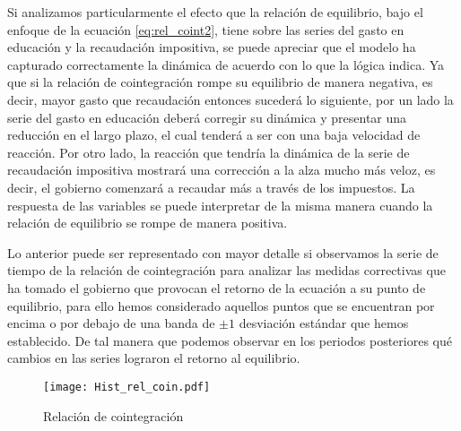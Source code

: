 Si analizamos particularmente el efecto que la relación de equilibrio, bajo el enfoque de la ecuación \ref{eq:rel_coint2}, tiene sobre las series del gasto en educación y la recaudación impositiva, se puede apreciar que el modelo ha capturado correctamente la dinámica de acuerdo con lo que la lógica indica. Ya que si la relación de cointegración rompe su equilibrio de manera negativa, es decir, mayor gasto que recaudación entonces sucederá lo siguiente, por un lado la serie del gasto en educación deberá corregir su dinámica y presentar una reducción en el largo plazo, el cual tenderá a ser con una baja velocidad de reacción. Por otro lado, la reacción que tendría la dinámica de la serie de recaudación impositiva mostrará una corrección a la alza mucho más veloz, es decir, el gobierno comenzará a recaudar más a través de los impuestos. La respuesta de las variables se puede interpretar de la misma manera cuando la relación de equilibrio se rompe de manera positiva.

Lo anterior puede ser representado con mayor detalle si observamos la serie de tiempo de la relación de cointegración para analizar las medidas correctivas que ha tomado el gobierno que provocan el retorno de la ecuación a su punto de equilibrio, para ello hemos considerado aquellos puntos que se encuentran por encima o por debajo de una banda de $\pm 1$ desviación estándar que hemos establecido. De tal manera que podemos observar en los periodos posteriores qué cambios en las series lograron el retorno al equilibrio.

\begin{figure}[H]
\centering
\texttt{[image: Hist\_rel\_coin.pdf]}
\caption{Relación de cointegración}
\label{hist_rel_coint}
\end{figure}



